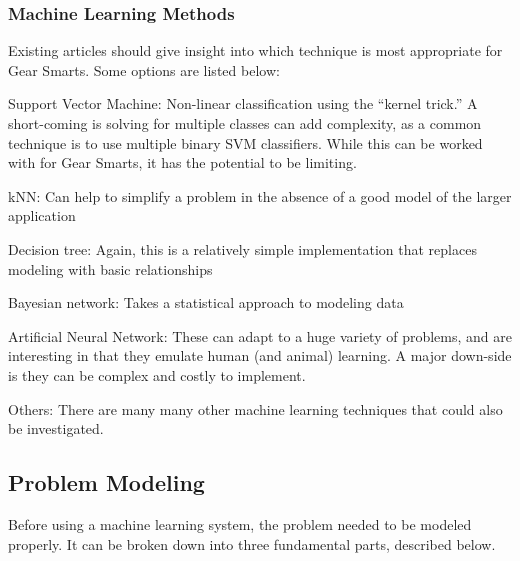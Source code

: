 \subsubsection{Machine Learning Methods}
\label{section:mloptions}
Existing articles should give insight into which technique is
most appropriate for Gear Smarts. Some options are listed below:

\begin{description}
  \item{Support Vector Machine:} Non-linear classification using the ``kernel trick.'' A short-coming is solving for multiple
  classes can add complexity, as a common technique is to use multiple binary SVM classifiers. While this can be worked with
  for Gear Smarts, it has the potential to be limiting.
  \item{kNN:} Can help to simplify a problem in the absence of a good model of the larger application
  \item{Decision tree:} Again, this is a relatively simple implementation that replaces modeling with basic relationships
  \item{Bayesian network:} Takes a statistical approach to modeling data
  \item{Artificial Neural Network:} These can adapt to a huge variety of problems, and are interesting in that they emulate
  human (and animal) learning. A major down-side is they can be complex and costly to implement.
  \item{Others:} There are many many other machine learning techniques that could also be investigated.
\end{description}

\subsection{Problem Modeling}
Before using a machine learning system, the problem needed to be modeled properly. It can be broken down into three
fundamental parts, described below.

